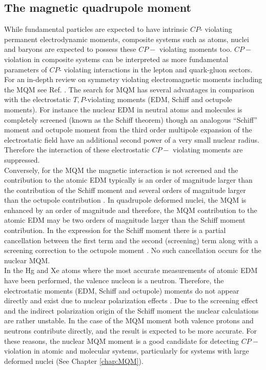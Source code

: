 \documentclass[10pt,a4paper, twoside, openright]{report}
\begin{document}
\subsection{The magnetic quadrupole moment}
While fundamental particles are expected to have intrinsic $CP$- violating permanent electrodynamic moments, composite systems such as atoms, nuclei and baryons are expected to possess these $CP-$ violating moments too. $CP-$ violation in composite systems can be interpreted as more fundamental parameters of $CP$- violating interactions in the lepton and quark-gluon sectors. For an in-depth review on symmetry violating electromagnetic moments including the MQM see Ref. \cite{GF2004, KhriplovichPNC, SFK1984, Roberts2015, KhriplovichCP, Pospelov2005}. The search for MQM has several advantages in comparison with the electrostatic $T,P$-violating moments (EDM, Schiff and octupole moments). For instance the nuclear EDM in neutral atoms and molecules is completely screened (known as the Schiff theorem\cite{Schiff1963}) though an analogous ``Schiff'' moment and octupole moment from the third order multipole expansion of the electrostatic field have an additional second power of a very small nuclear radius. Therefore the interaction of these electrostatic $CP-$ violating moments are suppressed. \\
\linebreak 
Conversely, for the MQM the magnetic interaction is not screened and the contribution to the atomic EDM typically is an order of magnitude larger than the contribution of the Schiff moment and several orders of magnitude larger than the octupole contribution \cite{SFK1984, Flambaum1997}.  In quadrupole deformed nuclei, the MQM is enhanced by an order of magnitude \cite{Flambaum1994} and therefore, the MQM contribution to the atomic EDM may be two orders of magnitude larger than the Schiff moment contribution. In the expression for the Schiff moment there is a partial cancellation between the first term and the second (screening) term along with a screening correction to the octupole moment \cite{ Flambaum1986, SFK1984, Flambaum2012}. No such cancellation occurs for the nuclear MQM.\\
\linebreak
In the Hg and Xe atoms  where the most accurate measurements of atomic EDM have been performed, the valence nucleon is a neutron. Therefore, the electrostatic moments (EDM, Schiff and octupole) moments do not appear directly and exist due to nuclear polarization effects \cite{Flambaum1986}. Due to the screening effect and the indirect polarization origin of the Schiff moment the nuclear calculations are rather unstable. In the case of the MQM moment both valence protons and neutrons  contribute directly, and the result is expected to be more accurate\cite{Flambaum2014}. For these reasons, the nuclear MQM moment is a good candidate for detecting $CP-$ violation in atomic and molecular systems, particularly for systems with large deformed nuclei (See Chapter \ref{chap:MQM}).\\
\end{document}
